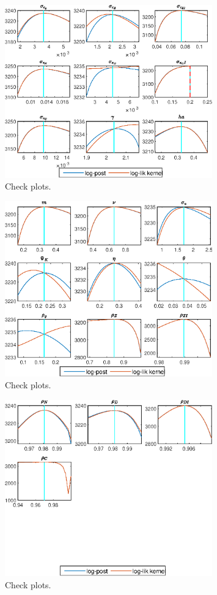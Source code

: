  
\begin{figure}[H]
\centering 
\includegraphics[width=0.80\textwidth]{BRS_growth_util_sectoral/graphs/BRS_growth_util_sectoral_CheckPlots1}
\caption{Check plots.}\label{Fig:CheckPlots:1}
\end{figure}
 
\begin{figure}[H]
\centering 
\includegraphics[width=0.80\textwidth]{BRS_growth_util_sectoral/graphs/BRS_growth_util_sectoral_CheckPlots2}
\caption{Check plots.}\label{Fig:CheckPlots:2}
\end{figure}
 
\begin{figure}[H]
\centering 
\includegraphics[width=0.80\textwidth]{BRS_growth_util_sectoral/graphs/BRS_growth_util_sectoral_CheckPlots3}
\caption{Check plots.}\label{Fig:CheckPlots:3}
\end{figure}
 
